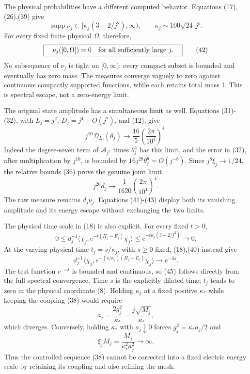 \documentclass[
  11pt,
]{article}
\begin{document}
The physical probabilities have a different computed behavior. Equations
(17),(26),(39) give \[
 \operatorname{supp}\nu_j\subset
 [\kappa_j(3-2/j^2),\infty),\qquad
 \kappa_j\sim100\sqrt{24}\,j^5.
\tag{41}
\] For every fixed finite physical \(\Omega\), therefore, \[
 \boxed{\quad \nu_j([0,\Omega])=0\quad\hbox{for all sufficiently large }j.\quad}
\tag{42}
\] No subsequence of \(\nu_j\) is tight on \([0,\infty)\): every compact
subset is bounded and eventually has zero mass. The measures converge
vaguely to zero against continuous compactly supported functions, while
each retains total mass 1. This is spectral escape, not a zero-energy
limit.

The original state amplitude has a simultaneous limit as well. Equations
(31)-(32), with \(L_j=j^2\), \(D_j=j^4+O(j^2)\), and (12), give \[
 j^{10}\mathcal D_{L_j}(\theta_j)
 \longrightarrow\frac{16}{5}\left(\frac{2\pi}{10^4}\right)^4.
\] Indeed the degree-seven term of \(\mathcal A_{j^2}\) times
\(\theta_j^4\) has this limit, and the error in (32), after
multiplication by \(j^{10}\), is bounded by
\(16j^{28}\theta_j^6=O(j^{-8})\). Since \(j^8\xi_j\to1/24\), the
relative bounds (36) prove the genuine joint limit \[
 \boxed{\quad
 j^{26}d_j\longrightarrow
 \frac1{1620}\left(\frac{2\pi}{10^4}\right)^4.
 \quad}
\tag{43}
\] The raw measure remains \(d_j\nu_j\). Equations (41)-(43) display
both its vanishing amplitude and its energy escape without exchanging
the two limits.

The physical time scale in (18) is also explicit. For every fixed
\(t>0\), \[
 0\le d_j^{-1}\langle\chi_j,e^{-t(H_j-E_j)}\chi_j\rangle
 \le e^{-t\kappa_j(3-2/j^2)}\longrightarrow0.
\tag{44}
\] At the varying physical time \(t_j=s/\kappa_j\), with \(s\ge0\)
fixed, (18),(40) instead give \[
 d_j^{-1}\langle\chi_j,e^{-(s/\kappa_j)(H_j-E_j)}\chi_j\rangle
 \longrightarrow e^{-3s}.
\tag{45}
\] The test function \(e^{-s\lambda}\) is bounded and continuous, so
(45) follows directly from the full spectral convergence. Time \(s\) is
the explicitly dilated time; \(t_j\) tends to zero in the physical
coordinate (8). Holding \(\kappa_j\) at a fixed positive \(\kappa_*\)
while keeping the coupling (38) would require \[
 a_j=\frac{2g_j^2}{\kappa_*}=\frac{j\sqrt{M_j}}{\kappa_*},
\] which diverges. Conversely, holding \(\kappa_*\) with
\(a_j\downarrow0\) forces \(g_j^2=\kappa_*a_j/2\) and \[
 \xi_jM_j=\frac{M_j}{\kappa_*^2a_j^2}\longrightarrow\infty.
\tag{46}
\] Thus the controlled sequence (38) cannot be corrected into a fixed
electric energy scale by retaining its coupling and also refining the
mesh.
\end{document}
